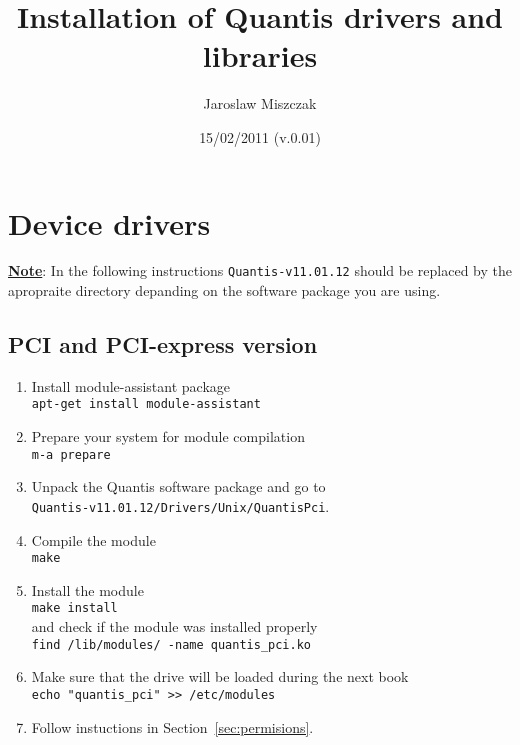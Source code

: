 \documentclass[a4paper]{scrartcl}
\title{Installation of Quantis drivers and libraries}
\author{Jaroslaw Miszczak}
\date{15/02/2011 (v.0.01)}
\begin{document}
\maketitle




\section{Device drivers}

\textbf{\underline{Note}}: In the following instructions
\texttt{Quantis-v11.01.12} should be replaced by the apropraite directory
depanding on the software package you are using.
\subsection{PCI and PCI-express version}
\begin{enumerate}
    \item Install module-assistant package\\ \texttt{apt-get install
    module-assistant} 
    \item Prepare your system for module compilation\\ \texttt{m-a prepare}
    \item Unpack the Quantis software package and go to\\
    \texttt{Quantis-v11.01.12/Drivers/Unix/QuantisPci}.
    \item Compile the module\\ \texttt{make}
    \item Install the module\\ \texttt{make install}\\ and check if the module was
    installed properly\\ \texttt{find /lib/modules/ -name quantis\_pci.ko}
    \item Make sure that the drive will be loaded during the next book \\ \texttt{echo "quantis\_pci" >> /etc/modules}
    \item Follow instuctions in Section~\ref{sec:permisions}.
\end{enumerate}
\end{document}
